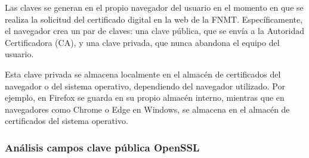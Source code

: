 Las claves se generan en el propio navegador del usuario en el momento en que se realiza la solicitud del certificado digital en la web de la FNMT. Específicamente, el navegador crea un par de claves: una clave pública, que se envía a la Autoridad Certificadora (CA), y una clave privada, que nunca abandona el equipo del usuario.  

Esta clave privada se almacena localmente en el almacén de certificados del navegador o del sistema operativo, dependiendo del navegador utilizado. Por ejemplo, en Firefox se guarda en su propio almacén interno, mientras que en navegadores como Chrome o Edge en Windows, se almacena en el almacén de certificados del sistema operativo. 


\subsubsection{Análisis campos clave pública OpenSSL}


